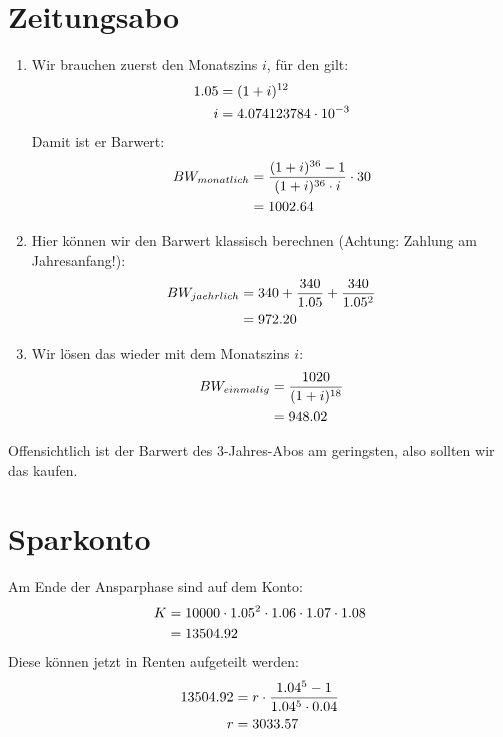 \documentclass{article}
\begin{document}
	\section*{Zeitungsabo}
	\begin{enumerate}[label=(\alph*)]
		\item Wir brauchen zuerst den Monatszins $i$, für den gilt:
		\begin{align}
			1.05 &= (1+i)^{12} \notag \\
			i &= 4.074123784\cdot 10^{-3} \notag
		\end{align}
		Damit ist er Barwert:
		\begin{align}
			BW_{monatlich} &= \frac{(1+i)^{36}-1}{(1+i)^{36}\cdot i}\cdot 30 \notag \\
			&= 1002.64 \notag
		\end{align}
		\item Hier können wir den Barwert klassisch berechnen (Achtung: Zahlung am Jahresanfang!):
		\begin{align}
			BW_{jaehrlich} &= 340 + \frac{340}{1.05} + \frac{340}{1.05^2} \notag \\
			&= 972.20 \notag
		\end{align}
		\item Wir lösen das wieder mit dem Monatszins $i$:
		\begin{align}
			BW_{einmalig} &= \frac{1020}{(1+i)^{18}} \notag \\
			&= 948.02 \notag
		\end{align}
	\end{enumerate}
	Offensichtlich ist der Barwert des 3-Jahres-Abos am geringsten, also sollten wir das kaufen.
	
	\section*{Sparkonto}
	Am Ende der Ansparphase sind auf dem Konto:
	\begin{align}
		K &= 10000\cdot 1.05^2\cdot 1.06\cdot 1.07\cdot 1.08 \notag \\
		&= 13504.92 \notag
	\end{align}
	Diese können jetzt in Renten aufgeteilt werden:
	\begin{align}
		13504.92 &= r\cdot \frac{1.04^5-1}{1.04^5\cdot 0.04} \notag \\
		r &= 3033.57 \notag
	\end{align}
	
\end{document}
